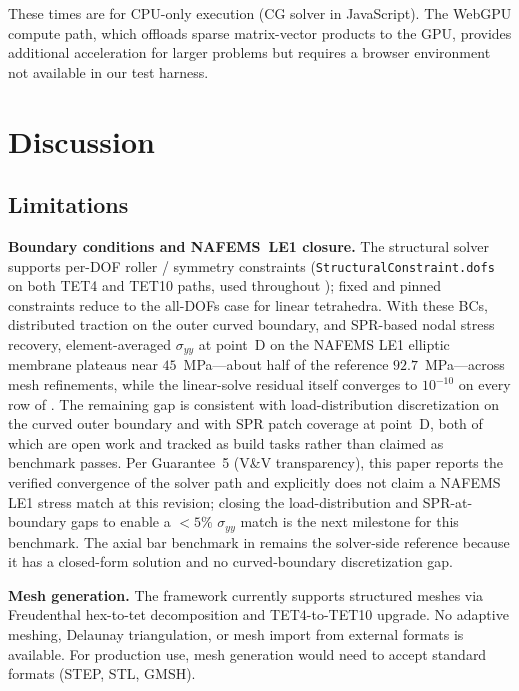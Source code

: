 \documentclass[journal]{IEEEtran}
\begin{document}
These times are for CPU-only execution (CG solver in JavaScript). The
WebGPU compute path, which offloads sparse matrix-vector products to the
GPU, provides additional acceleration for larger problems but requires a
browser environment not available in our test harness.


\section{Discussion}
\label{sec:discussion}

\subsection{Limitations}
\label{sec:discussion:limitations}

\textbf{Boundary conditions and NAFEMS~LE1 closure.}
The structural solver supports per-DOF roller / symmetry constraints
(\texttt{StructuralConstraint.dofs} on both TET4 and TET10 paths, used
throughout ); fixed and pinned constraints reduce
to the all-DOFs case for linear tetrahedra. With these BCs, distributed
traction on the outer curved boundary, and SPR-based nodal stress
recovery, element-averaged $\sigma_{yy}$ at point~D on the NAFEMS LE1
elliptic membrane plateaus near $45$~MPa---about half of the reference
$92.7$~MPa---across mesh refinements, while the linear-solve residual
itself converges to $10^{-10}$ on every row of .
The remaining gap is consistent with load-distribution discretization on
the curved outer boundary and with SPR patch coverage at point~D, both
of which are open work and tracked as build tasks rather than claimed as
benchmark passes. Per Guarantee~5 (V\&V transparency), this paper
reports the verified convergence of the solver path and explicitly does
not claim a NAFEMS LE1 stress match at this revision; closing the
load-distribution and SPR-at-boundary gaps to enable a $< 5\%$
$\sigma_{yy}$ match is the next milestone for this benchmark. The axial
bar benchmark in  remains the
solver-side reference because it has a closed-form solution and no
curved-boundary discretization gap.

\textbf{Mesh generation.} The framework currently supports structured meshes
via Freudenthal hex-to-tet decomposition and TET4-to-TET10 upgrade. No
adaptive meshing, Delaunay triangulation, or mesh import from external
formats is available. For production use, mesh generation would need to
accept standard formats (STEP, STL, GMSH).
\end{document}
